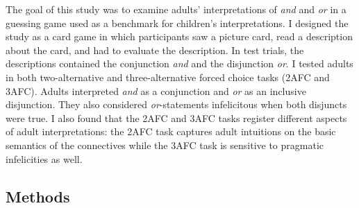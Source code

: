 \documentclass[oneside]{report}
\theoremstyle{definition}
\theoremstyle{definition}
\theoremstyle{definition}
\theoremstyle{remark}
\begin{document}
The goal of this study was to examine adults' interpretations of
\emph{and} and \emph{or} in a guessing game used as a benchmark for
children's interpretations. I designed the study as a card game in which
participants saw a picture card, read a description about the card, and
had to evaluate the description. In test trials, the descriptions
contained the conjunction \emph{and} and the disjunction \emph{or}. I
tested adults in both two-alternative and three-alternative forced
choice tasks (2AFC and 3AFC). Adults interpreted \emph{and} as a
conjunction and \emph{or} as an inclusive disjunction. They also
considered \emph{or}-statements infelicitous when both disjuncts were
true. I also found that the 2AFC and 3AFC tasks register different
aspects of adult interpretations: the 2AFC task captures adult
intuitions on the basic semantics of the connectives while the 3AFC task
is sensitive to pragmatic infelicities as well.

\subsection{Methods}\label{methods}
\end{document}
